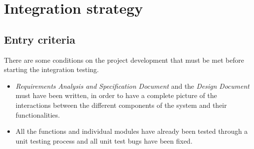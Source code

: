 \pagebreak
\section{Integration strategy}

\subsection{Entry criteria}
There are some conditions on the project development that must be met before starting the integration testing. 

\begin{itemize}
	\item \textit{Requirements Analysis and Specification Document} and the \textit{Design Document} must have been written, in order to have a complete picture of the interactions between the different components of the system and their functionalities.
	\item All the functions and individual modules have already been tested through a unit testing process and all unit test bugs have been fixed.
\end{itemize}


